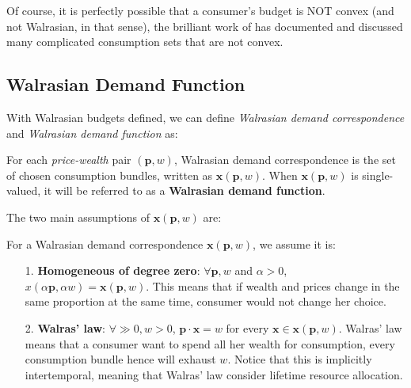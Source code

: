 Of course, it is perfectly possible that a consumer's budget is NOT convex (and not Walrasian, in that sense), the brilliant work of \citet{deaton1980economics} has documented and discussed many complicated consumption sets that are not convex.

\subsection{Walrasian Demand Function}
With Walrasian budgets defined, we can define \textit{Walrasian demand correspondence} and \textit{Walrasian demand function} as:
\begin{definition}
    For each \textit{price-wealth} pair $(\mathbf{p},w)$, Walrasian demand correspondence is the set of chosen consumption bundles, written as $\mathbf{x}(\mathbf{p},w)$. When $\mathbf{x}(\mathbf{p},w)$ is single-valued, it will be referred to as a \textbf{Walrasian demand function}.
\end{definition}

The two main assumptions of $\mathbf{x}(\mathbf{p},w)$ are:
\begin{definition}
    For a Walrasian demand correspondence $\mathbf{x}(\mathbf{p},w)$, we assume it is:
    \begin{enumerate}
        \item[1.] \textbf{Homogeneous of degree zero}: $\forall \mathbf{p},w$ and $\alpha >0$, $x(\alpha \mathbf{p},\alpha w)=\mathbf{x}(\mathbf{p},w)$. This means that if wealth and prices change in the same proportion at the same time, consumer would not change her choice.
        \item[2.] \textbf{Walras' law}: $\forall \gg 0,w>0$, $\mathbf{p}\cdot\mathbf{x}=w$ for every $\mathbf{x}\in \mathbf{x}(\mathbf{p},w)$. Walras' law means that a consumer want to spend all her wealth for consumption, every consumption bundle hence will exhaust $w$. Notice that this is implicitly intertemporal, meaning that Walras' law consider lifetime resource allocation.
    \end{enumerate}
\end{definition}